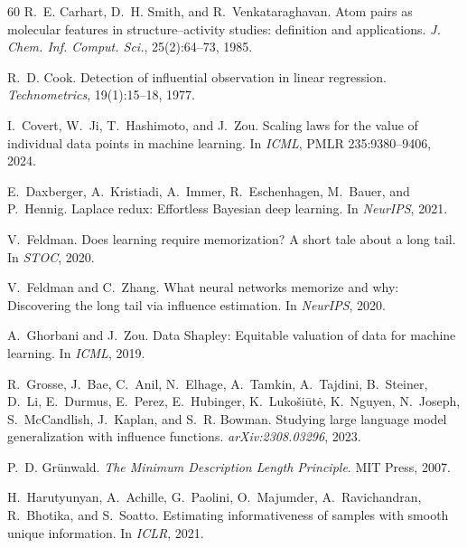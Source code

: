 \documentclass[10pt,twocolumn,letterpaper]{article}
\theoremstyle{definition}
\begin{document}
\begin{thebibliography}{60}
R.~E. Carhart, D.~H. Smith, and R.~Venkataraghavan.
\newblock Atom pairs as molecular features in structure--activity studies: definition and applications.
\newblock \emph{J. Chem. Inf. Comput. Sci.}, 25(2):64--73, 1985.

R.~D. Cook.
\newblock Detection of influential observation in linear regression.
\newblock \emph{Technometrics}, 19(1):15--18, 1977.

I.~Covert, W.~Ji, T.~Hashimoto, and J.~Zou.
\newblock Scaling laws for the value of individual data points in machine learning.
\newblock In \emph{ICML}, PMLR 235:9380--9406, 2024.

E.~Daxberger, A.~Kristiadi, A.~Immer, R.~Eschenhagen, M.~Bauer, and P.~Hennig.
\newblock Laplace redux: Effortless {B}ayesian deep learning.
\newblock In \emph{NeurIPS}, 2021.

V.~Feldman.
\newblock Does learning require memorization? {A} short tale about a long tail.
\newblock In \emph{STOC}, 2020.

V.~Feldman and C.~Zhang.
\newblock What neural networks memorize and why: Discovering the long tail via influence estimation.
\newblock In \emph{NeurIPS}, 2020.

A.~Ghorbani and J.~Zou.
\newblock Data {S}hapley: Equitable valuation of data for machine learning.
\newblock In \emph{ICML}, 2019.

R.~Grosse, J.~Bae, C.~Anil, N.~Elhage, A.~Tamkin, A.~Tajdini, B.~Steiner, D.~Li, E.~Durmus, E.~Perez, E.~Hubinger, K.~Luko{\v{s}}i{\=u}t{\.e}, K.~Nguyen, N.~Joseph, S.~McCandlish, J.~Kaplan, and S.~R. Bowman.
\newblock Studying large language model generalization with influence functions.
\newblock \emph{arXiv:2308.03296}, 2023.

P.~D. Gr{\"u}nwald.
\newblock \emph{The Minimum Description Length Principle}.
\newblock MIT Press, 2007.

H.~Harutyunyan, A.~Achille, G.~Paolini, O.~Majumder, A.~Ravichandran, R.~Bhotika, and S.~Soatto.
\newblock Estimating informativeness of samples with smooth unique information.
\newblock In \emph{ICLR}, 2021.


\end{thebibliography}
\end{document}
